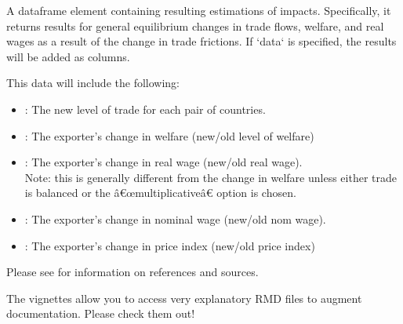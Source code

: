 \documentclass[a4paper]{book}
\begin{document}
\begin{Value}
A dataframe element containing resulting estimations of impacts.
Specifically, it returns results for general equilibrium changes in trade flows,
welfare, and real wages as a result of the change in trade frictions.
If `data` is specified, the results will be added as columns.

This data will include the following:
\begin{itemize}

\item{} :   The new level of trade for each pair of countries.
\item{} :     The exporter's change in welfare (new/old level of welfare)
\item{} :   The exporter's change in real wage (new/old real wage). \\{}
Note: this is generally different from the change in welfare
unless either trade is balanced or the â€œmultiplicativeâ€ option is chosen.
\item{} :    The exporter's change in nominal wage (new/old nom wage).
\item{} : The exporter's change in price index (new/old price index)

\end{itemize}

\end{Value}
%
\begin{References}\relax
Please see  for information on references and sources.
\end{References}
%
\begin{SeeAlso}\relax
The vignettes allow you to access very explanatory RMD files to augment documentation.
Please check them out!
\end{SeeAlso}
%
\end{document}
